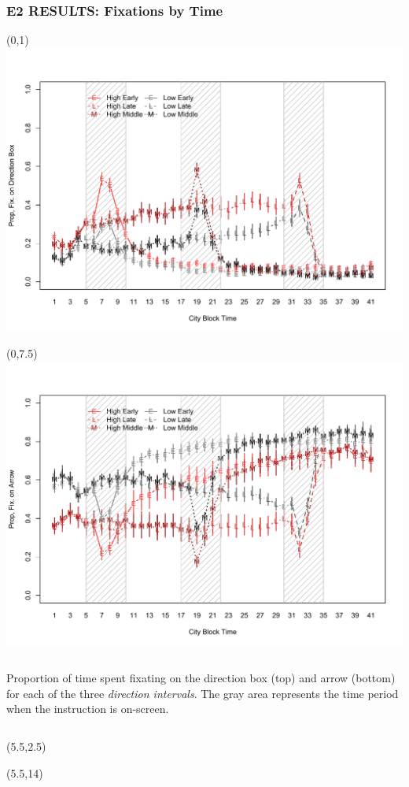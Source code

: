 \documentclass{beamer}
\begin{document}
\begin{frame} 
	\frametitle{E2 RESULTS: Fixations by Time}
	  \begin{textblock}{2.5}(0,1)	
  		\includegraphics[scale=.3]{../zNvBkFigs/Rplot-E2-FixProp-DB-byCB}
    	   \end{textblock} 
	  \begin{textblock}{3}(0,7.5)	
  		\includegraphics[scale=.3]{../zNvBkFigs/Rplot-E2-FixProp-Arrw-byCB}
    	   \end{textblock} 
		\begin{columns}
				 \small{Proportion of time spent fixating on the direction box (top) and arrow (bottom) for each of the three \emph{direction intervals}.  The gray area represents the time period when the instruction is on-screen.}
	\end{columns}
	\begin{textblock}{3}(5.5,2.5)	
		\color{wdgRed}{Direction Box}
    	\end{textblock} 
	\begin{textblock}{3}(5.5,14)	
		\color{wdgRed}{Arrow}
    	\end{textblock} 

\end{frame}
\end{document}
